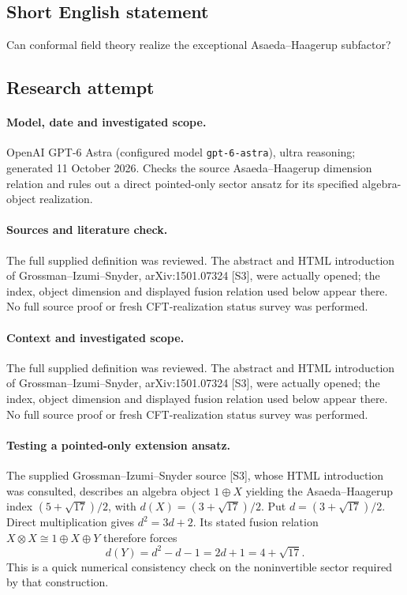 \documentclass[11pt]{article}
\begin{document}
\subsection{Short English statement}
Can conformal field theory realize the exceptional Asaeda--Haagerup subfactor?
\subsection{Research attempt}
\paragraph{Model, date and investigated scope.}
OpenAI GPT-6 Astra (configured model \texttt{gpt-6-astra}), ultra reasoning; generated 11 October 2026. Checks the source Asaeda–Haagerup dimension relation and rules out a direct pointed-only sector ansatz for its specified algebra-object realization.

\paragraph{Sources and literature check.}
The full supplied definition was reviewed. The abstract and HTML introduction of Grossman–Izumi–Snyder, arXiv:1501.07324 [S3], were actually opened; the index, object dimension and displayed fusion relation used below appear there. No full source proof or fresh CFT-realization status survey was performed.

\paragraph{Context and investigated scope.} The full supplied definition was reviewed. The abstract and HTML introduction of Grossman–Izumi–Snyder, arXiv:1501.07324 [S3], were actually opened; the index, object dimension and displayed fusion relation used below appear there. No full source proof or fresh CFT-realization status survey was performed.

\paragraph{Testing a pointed-only extension ansatz.} The supplied Grossman--Izumi--Snyder source [S3], whose HTML introduction was consulted, describes an algebra object $1\oplus X$ yielding the Asaeda--Haagerup index $(5+\sqrt{17})/2$, with $d(X)=(3+\sqrt{17})/2$. Put $d=(3+\sqrt{17})/2$. Direct multiplication gives $d^2=3d+2$. Its stated fusion relation $X\otimes X\cong1\oplus X\oplus Y$ therefore forces
\[
 d(Y)=d^2-d-1=2d+1=4+\sqrt{17}.
\]
This is a quick numerical consistency check on the noninvertible sector required by that construction.
\end{document}
